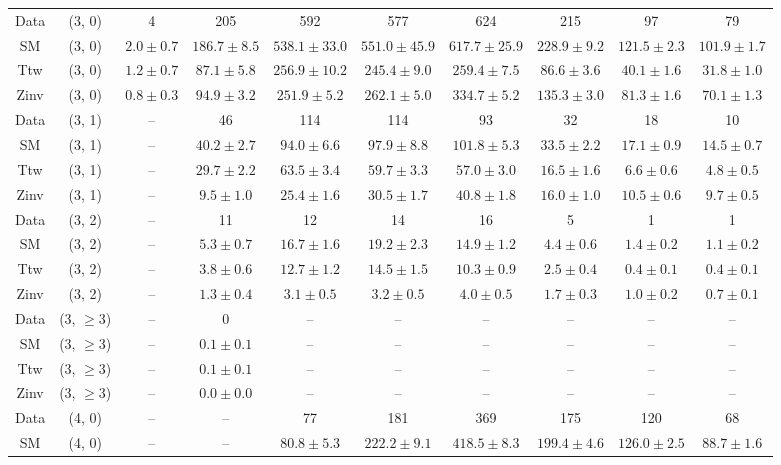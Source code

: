 \begin{table}[h!]
{\begin{tabular}{cccccccccc}
	Data & (3, 0) & 4 & 205 & 592 & 577 & 624 & 215 & 97 & 79 \\[0.5ex] 
	SM & (3, 0) & $2.0\pm 0.7$ & $186.7\pm 8.5$ & $538.1\pm 33.0$ & $551.0\pm 45.9$ & $617.7\pm 25.9$ & $228.9\pm 9.2$ & $121.5\pm 2.3$ & $101.9\pm 1.7$ \\[0.5ex] 
	Ttw & (3, 0) & $1.2\pm 0.7$ & $87.1\pm 5.8$ & $256.9\pm 10.2$ & $245.4\pm 9.0$ & $259.4\pm 7.5$ & $86.6\pm 3.6$ & $40.1\pm 1.6$ & $31.8\pm 1.0$ \\[0.5ex] 
	Zinv & (3, 0) & $0.8\pm 0.3$ & $94.9\pm 3.2$ & $251.9\pm 5.2$ & $262.1\pm 5.0$ & $334.7\pm 5.2$ & $135.3\pm 3.0$ & $81.3\pm 1.6$ & $70.1\pm 1.3$ \\[0.5ex] 
	Data & (3, 1) & -- & 46 & 114 & 114 & 93 & 32 & 18 & 10 \\[0.5ex] 
	SM & (3, 1) & -- & $40.2\pm 2.7$ & $94.0\pm 6.6$ & $97.9\pm 8.8$ & $101.8\pm 5.3$ & $33.5\pm 2.2$ & $17.1\pm 0.9$ & $14.5\pm 0.7$ \\[0.5ex] 
	Ttw & (3, 1) & -- & $29.7\pm 2.2$ & $63.5\pm 3.4$ & $59.7\pm 3.3$ & $57.0\pm 3.0$ & $16.5\pm 1.6$ & $6.6\pm 0.6$ & $4.8\pm 0.5$ \\[0.5ex] 
	Zinv & (3, 1) & -- & $9.5\pm 1.0$ & $25.4\pm 1.6$ & $30.5\pm 1.7$ & $40.8\pm 1.8$ & $16.0\pm 1.0$ & $10.5\pm 0.6$ & $9.7\pm 0.5$ \\[0.5ex] 
	Data & (3, 2) & -- & 11 & 12 & 14 & 16 & 5 & 1 & 1 \\[0.5ex] 
	SM & (3, 2) & -- & $5.3\pm 0.7$ & $16.7\pm 1.6$ & $19.2\pm 2.3$ & $14.9\pm 1.2$ & $4.4\pm 0.6$ & $1.4\pm 0.2$ & $1.1\pm 0.2$ \\[0.5ex] 
	Ttw & (3, 2) & -- & $3.8\pm 0.6$ & $12.7\pm 1.2$ & $14.5\pm 1.5$ & $10.3\pm 0.9$ & $2.5\pm 0.4$ & $0.4\pm 0.1$ & $0.4\pm 0.1$ \\[0.5ex] 
	Zinv & (3, 2) & -- & $1.3\pm 0.4$ & $3.1\pm 0.5$ & $3.2\pm 0.5$ & $4.0\pm 0.5$ & $1.7\pm 0.3$ & $1.0\pm 0.2$ & $0.7\pm 0.1$ \\[0.5ex] 
	Data & (3, $\ge3$) & -- & 0 & -- & -- & -- & -- & -- & -- \\[0.5ex] 
	SM & (3, $\ge3$) & -- & $0.1\pm 0.1$ & -- & -- & -- & -- & -- & -- \\[0.5ex] 
	Ttw & (3, $\ge3$) & -- & $0.1\pm 0.1$ & -- & -- & -- & -- & -- & -- \\[0.5ex] 
	Zinv & (3, $\ge3$) & -- & $0.0\pm 0.0$ & -- & -- & -- & -- & -- & -- \\[0.5ex] 
	Data & (4, 0) & -- & -- & 77 & 181 & 369 & 175 & 120 & 68 \\[0.5ex] 
	SM & (4, 0) & -- & -- & $80.8\pm 5.3$ & $222.2\pm 9.1$ & $418.5\pm 8.3$ & $199.4\pm 4.6$ & $126.0\pm 2.5$ & $88.7\pm 1.6$ \\[0.5ex] 

\end{tabular}}
\end{table}
